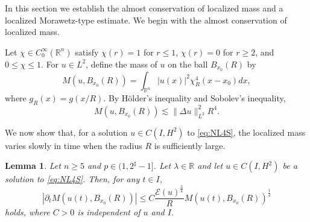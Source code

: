\documentclass[11pt,a4paper]{article}
\numberwithin{equation}{section}
\newtheorem{lemma}[theorem]{Lemma}
\begin{document}
In this section we establish the almost conservation of localized mass and a localized Morawetz-type estimate.
We begin with the almost conservation of localized mass.

Let $\chi \in C^{\infty}_{0}(\mathbb{R}^{n})$ satisfy $\chi(r)=1$ for $r \leq 1$, $\chi(r)=0$ for $r \geq 2$, and $0 \leq \chi \leq 1$.
For $u \in L^{2}$, define the mass of $u$ on the ball $B_{x_{0}}(R)$ by
\begin{equation}\label{localize mass}
M(u, B_{x_{0}}(R)) = \int_{\mathbb{R}^{n}}|u(x)|^{2}\chi_{R}^{4}(x - x_{0})dx,
\end{equation}
where $g_{R}(x) = g(x /R)$.
By H\"older's inequality and Sobolev's inequality,
\begin{equation}\label{estimate for local mass 1}
M(u, B_{x_{0}}(R)) \lesssim \|\Delta u\|^{2}_{L^{2}}R^{4}.
\end{equation}

We now show that, for a solution $u \in C(I, H^{2})$ to \eqref{eq:NL4S}, the localized mass varies slowly in time when the radius $R$ is sufficiently large.

\begin{lemma}
Let $n \geq 5$ and $p \in (1, 2^{\sharp} - 1]$. Let $\lambda \in \mathbb{R}$ and let $u \in C(I, H^{2})$ be a solution to \eqref{eq:NL4S}.
Then, for any $t \in I$,
\begin{equation}\label{estimate for local mass 2}
|\partial_{t}M(u(t), B_{x_{0}}(R))| \leq C\dfrac{\mathcal{E}(u)^{\frac{3}{4}}}{R}M(u(t), B_{x_{0}}(R))^{\frac{1}{4}}
\end{equation}
holds, where $C > 0$ is independent of $u$ and $I$.
\end{lemma}
\end{document}
